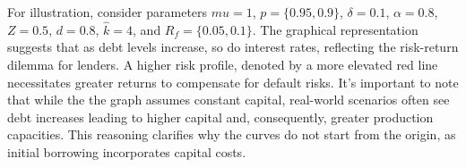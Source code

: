 \documentclass[12pt]{article}
\begin{document}
For illustration, consider parameters \(mu = 1\), \(p = \{0.95,0.9\}\), \(\delta = 0.1\), \(\alpha = 0.8\), \(Z = 0.5\), \(d =
0.8\), \(\widehat{k} = 4\), and \(R_f=\{0.05,0.1\}\). The graphical representation suggests that as debt levels
increase, so do interest rates, reflecting the risk-return dilemma for lenders. A higher risk profile, denoted by a more
elevated red line necessitates greater returns to compensate for default risks. It's important to note that while the
the graph assumes constant capital, real-world scenarios often see debt increases leading to higher capital and,
consequently, greater production capacities. This reasoning clarifies why  the curves do not start from the origin, as
initial borrowing incorporates capital costs.
\begin{figure}
    \centering
\end{figure}
\end{document}
